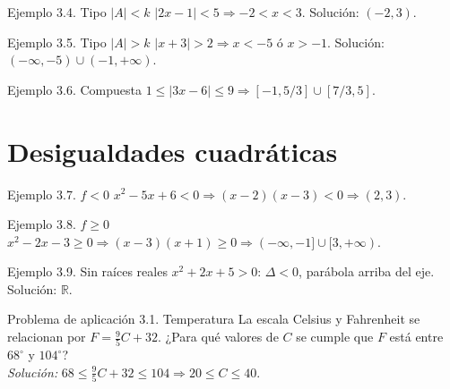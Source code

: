 \documentclass[12pt,letterpaper]{book}
\begin{document}
\begin{ejbox}{Ejemplo 3.4. Tipo $|A|<k$}
$|2x-1|<5\Rightarrow-2<x<3$. Solución: $(-2,3)$.
\end{ejbox}

\begin{ejbox}{Ejemplo 3.5. Tipo $|A|>k$}
$|x+3|>2\Rightarrow x<-5$ ó $x>-1$. Solución: $(-\infty,-5)\cup(-1,+\infty)$.
\end{ejbox}

\begin{ejbox}{Ejemplo 3.6. Compuesta}
$1\leq|3x-6|\leq9\Rightarrow[-1,5/3]\cup[7/3,5]$.
\end{ejbox}

\section{Desigualdades cuadráticas}

\begin{center}
\end{center}

\begin{ejbox}{Ejemplo 3.7. $f<0$}
$x^2-5x+6<0\Rightarrow(x-2)(x-3)<0\Rightarrow(2,3)$.
\end{ejbox}

\begin{ejbox}{Ejemplo 3.8. $f\geq0$}
$x^2-2x-3\geq0\Rightarrow(x-3)(x+1)\geq0\Rightarrow(-\infty,-1]\cup[3,+\infty)$.
\end{ejbox}

\begin{ejbox}{Ejemplo 3.9. Sin raíces reales}
$x^2+2x+5>0$: $\Delta<0$, parábola arriba del eje. Solución: $\mathbb{R}$.
\end{ejbox}

\begin{aplbox}{Problema de aplicación 3.1. Temperatura}
La escala Celsius y Fahrenheit se relacionan por $F=\tfrac95C+32$. ¿Para qué valores de $C$ se cumple que $F$ está entre $68^\circ$ y $104^\circ$?\\
\textit{Solución:} $68\leq\tfrac95C+32\leq104\Rightarrow20\leq C\leq40$.
\end{aplbox}
\end{document}
